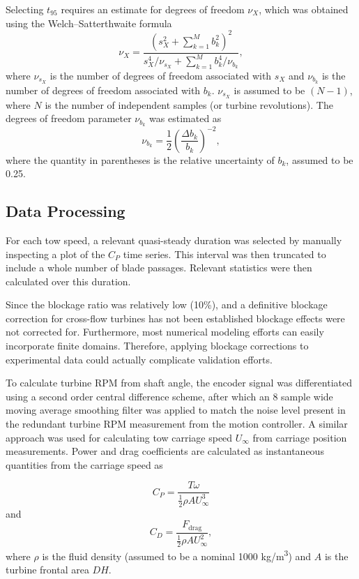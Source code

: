 \documentclass[10pt,letterpaper]{article}
\begin{document}
Selecting $t_{95}$ requires an estimate for degrees of freedom $\nu_X$, which
was obtained using the Welch--Satterthwaite formula
\begin{equation}
    \nu_X = \frac{\left(s_X^2 + \sum_{k=1}^M b_k^2 \right)^2} {s_X^4/\nu_{s_X} +
    \sum_{k=1}^M b_k^4/\nu_{b_k}},
\end{equation}
where $\nu_{s_X}$ is the number of degrees of freedom associated with $s_X$ and
$\nu_{b_k}$ is the number of degrees of freedom associated with $b_k$.
$\nu_{s_X}$ is assumed to be $(N-1)$, where $N$ is the number of independent
samples (or turbine revolutions). The degrees of freedom parameter $\nu_{b_k}$
was estimated as
\begin{equation}
    \nu_{b_k} = \frac{1}{2} \left( \frac{\Delta b_k}{b_k} \right)^{-2},
\end{equation}
where the quantity in parentheses is the relative uncertainty of $b_k$, assumed
to be 0.25.


\subsection*{Data Processing}

For each tow speed, a relevant quasi-steady duration was selected by manually
inspecting a plot of the $C_P$ time series. This interval was then truncated to
include a whole number of blade passages. Relevant statistics were then
calculated over this duration.

Since the blockage ratio was relatively low (10\%), and a definitive blockage
correction for cross-flow turbines has not been established \cite{Cavagnaro2014}
blockage effects were not corrected for. Furthermore, most numerical modeling
efforts can easily incorporate finite domains. Therefore, applying blockage
corrections to experimental data could actually complicate validation efforts.

To calculate turbine RPM from shaft angle, the encoder signal was differentiated
using a second order central difference scheme, after which an 8 sample wide
moving average smoothing filter was applied to match the noise level present in
the redundant turbine RPM measurement from the motion controller. A similar
approach was used for calculating tow carriage speed $U_\infty$ from carriage
position measurements. Power and drag coefficients are calculated as
instantaneous quantities from the carriage speed as

\begin{equation}
    C_P = \frac{T \omega}{\frac{1}{2} \rho A U_\infty^3}
\end{equation}
and
\begin{equation}
    C_D = \frac{F_\mathrm{drag}}{\frac{1}{2} \rho A U_\infty^2},
\end{equation}
where $\rho$ is the fluid density (assumed to be a nominal 1000
kg/m\textsuperscript{3}) and $A$ is the turbine frontal area $DH$.
\end{document}
